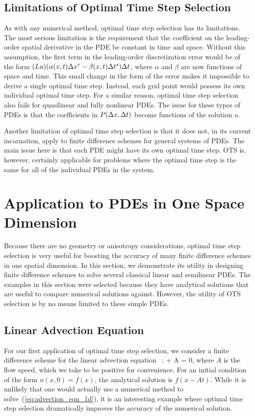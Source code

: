 \documentclass[fleqn,12pt,twoside]{article}
\begin{document}
\subsection{Limitations of Optimal Time Step Selection}
As with any numerical method, optimal time step selection has its limitations.
The most serious limitation is the requirement that the coefficient on the 
leading-order spatial derivative in the PDE be constant in time and space.  
Without this assumption, the first term in the leading-order discretization 
error would be of the form 
$(L u) (\alpha(x,t) \Delta x^r - \beta(x,t) \Delta t^s) \Delta t$,
where $\alpha$ and $\beta$ are now functions of space and time.  This
small change in the form of the error makes it impossible to derive a single 
optimal time step.  Instead, each grid point would possess its own individual 
optimal time step.  For a similar reason, optimal time step selection also 
fails for quasilinear and fully nonlinear PDEs.  The issue for these types of 
PDEs is that the coefficients in $P(\Delta x, \Delta t)$ become functions of the 
solution $u$.

Another limitation of optimal time step selection is that it does not,
in its current incarnation, apply to finite difference schemes for general
systems of PDEs.  The main issue here is that each PDE might have its 
own optimal time step.  OTS is, however, certainly applicable for problems 
where the optimal time step is the same for all of the individual PDEs in the 
system.


\section{\label{sec:applications_1d} 
         Application to PDEs in One Space Dimension}
Because there are no geometry or anisotropy considerations, optimal time step 
selection is very useful for boosting the accuracy of many finite difference 
schemes in one spatial dimension.  In this section, we demonstrate its 
utility in designing finite difference schemes to solve several classical 
linear and semilinear PDEs.  The examples in this section were selected 
because they have analytical solutions that are useful to compare numerical 
solutions against.  However, the utility of OTS selection is by no means 
limited to these simple PDEs.


\subsection{Linear Advection Equation}
For our first application of optimal time step selection, we consider 
a finite difference scheme for the linear advection equation
~\cite{gko_book,leveque_book_1992,leveque_book_2002}:
\beq
   + A  = 0,
  \label{eq:advection_eqn_1d}
\eeq
where $A$ is the flow speed, which we take to be positive for convenience.  
For an initial condition of the form $u(x,0) = f(x)$, the analytical solution 
is $f(x-At)$.  While it is unlikely that one would actually use a numerical 
method to solve~(\ref{eq:advection_eqn_1d}), it is an interesting example 
where optimal time step selection dramatically improves the accuracy of the 
numerical solution. 
\end{document}
